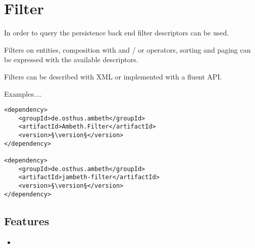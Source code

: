 \section{Filter}
\label{module:Filter}
\ClearAPI
In order to query the persistence back end filter descriptors can be used. 

Filters on entities, composition with and / or operators, sorting and paging can be expressed with the available descriptors.

Filters can be described with XML or implemented with a fluent API.

\TODO Examples....

\begin{lstlisting}[style=POM,caption={Maven modules to use \emph{Ambeth Filter}}]
<dependency>
	<groupId>de.osthus.ambeth</groupId>
	<artifactId>Ambeth.Filter</artifactId>
	<version>§\version§</version>
</dependency>

<dependency>
	<groupId>de.osthus.ambeth</groupId>
	<artifactId>jambeth-filter</artifactId>
	<version>§\version§</version>
</dependency>
\end{lstlisting}
\subsection{Features}
\begin{itemize}
	\item \TODO
\end{itemize}

